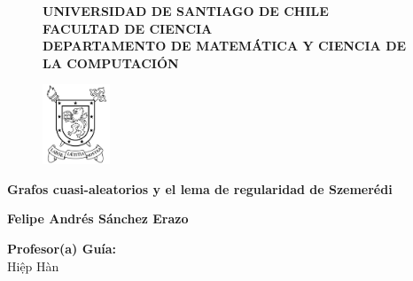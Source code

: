 
\begin{titlepage}


\begin{figure}[ht]
\hspace{0.1\linewidth}
\begin{minipage}[b]{0.75\linewidth}
\begin{center}
\textbf{\Large{UNIVERSIDAD DE SANTIAGO DE CHILE}}\\
\textbf{FACULTAD DE CIENCIA}\\
\textbf{DEPARTAMENTO DE MATEMÁTICA Y CIENCIA DE LA COMPUTACIÓN}
\end{center}	
\end{minipage}
\begin{minipage}[b]{0.1\linewidth}
\centering
\includegraphics[width=2cm]{Imágenes/logo5}
\end{minipage}
\end{figure}

\begin{center}
\vspace{2.5cm}

\begin{center}
\Large{\textbf{Grafos cuasi-aleatorios y el lema de regularidad de Szemerédi}}
\end{center}
\smallskip

\begin{center}
{\textbf{Felipe Andrés Sánchez Erazo}}
\end{center}
\vspace{2.5cm}

\hspace{0.45\linewidth}
\begin{minipage}[b]{0.45\linewidth}
\begin{flushleft}
\textbf{Profesor(a) Guía:}\\
Hi\d{ê}p Hàn
\end{flushleft}
\end{minipage}


\end{center}
\end{titlepage}
